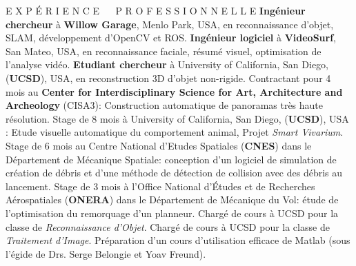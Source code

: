 




\begin{rubric}{E X P \'{E} R I E N C E ~~ P R O F E S S I O N N E L L E}
\entry*[2011--maintenant]%
  \textbf{Ing\'{e}nieur chercheur} \`{a} \textbf{Willow Garage}, Menlo Park,
USA,
en reconnaissance d'objet, SLAM, d\'{e}veloppement d'OpenCV et ROS.
\entry*[2009--2011]%
  \textbf{Ing\'{e}nieur logiciel} \`{a} \textbf{VideoSurf}, San Mateo, USA,
en reconnaissance faciale, r\'{e}sum\'{e} visuel, optimisation de l'analyse
vid\'{e}o.
\entry*[2004--2009]%
  \textbf{Etudiant chercheur} \`{a} University of
California, San Diego, (\textbf{UCSD}), USA, en reconstruction 3D d'objet
non-rigide.
\entry*[2007]
  Contractant pour 4 mois au \textbf{Center for Interdisciplinary Science for Art, Architecture and Archeology} (CISA3): Construction automatique de panoramas tr\`{e}s haute r\'{e}solution.
\entry*[2003]
  Stage de 8 mois \`{a} University of California, San Diego,  (\textbf{UCSD}), USA : Etude visuelle automatique du comportement animal, Projet {\em Smart Vivarium}.
\entry*[2002]
  Stage de 6 mois au Centre National d'Etudes Spatiales (\textbf{CNES}) dans le D\'{e}partement de M\'{e}canique Spatiale: conception d'un logiciel de simulation de cr\'{e}ation de d\'{e}bris et d'une m\'{e}thode de d\'{e}tection de collision avec des d\'{e}bris au lancement.
\entry*[2002]
  Stage de 3 mois \`{a} l'Office National d'\'{E}tudes et de Recherches
A\'{e}rospatiales (\textbf{ONERA}) dans le D\'{e}partement de M\'{e}canique du
Vol: \'e{tude} de l'optimisation du remorquage d'un planneur.
\entry*[2007]
  Charg\'{e} de cours \`{a} UCSD pour la classe de \emph{Reconnaissance d'Objet}.
\entry*[2007]
  Charg\'{e} de cours \`{a} UCSD pour la classe de \emph{Traitement d'Image}.
\entry*[2006]
  Pr\'{e}paration d'un cours d'utilisation efficace de Matlab (sous l'\'{e}gide de Drs. Serge Belongie et Yoav Freund).

\end{rubric}
